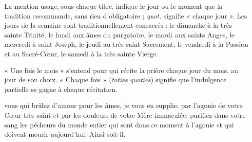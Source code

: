 \documentclass{bibliotheca-missel}
\begin{document}
\begin{notice}
La mention {\color{rubrique}\petitescaps usage}, sous chaque titre, indique le jour ou le moment que la tradition recommande, sans rien d’obligatoire ; \textit{quot.} signifie « chaque jour ». Les jours de la semaine sont traditionnellement consacrés : le dimanche à la très sainte Trinité, le lundi aux âmes du purgatoire, le mardi aux saints Anges, le mercredi à saint Joseph, le jeudi au très saint Sacrement, le vendredi à la Passion et au Sacré-Cœur, le samedi à la très sainte Vierge.

« Une fois le mois » s’entend pour qui récite la prière chaque jour du mois, au jour de son choix. « Chaque fois » (\textit{toties quoties}) signifie que l’indulgence partielle se gagne à chaque récitation.
\end{notice}
\clearpage

\mainmatter



 vous qui brûlez d’amour pour les âmes, je vous en supplie, par l’agonie de votre Cœur très saint et par les douleurs de votre Mère immaculée, purifiez dans votre sang les pécheurs du monde entier qui sont dans ce moment à l’agonie et qui doivent mourir aujourd’hui. Ainsi soit-il.
\culdelampe


\end{document}
